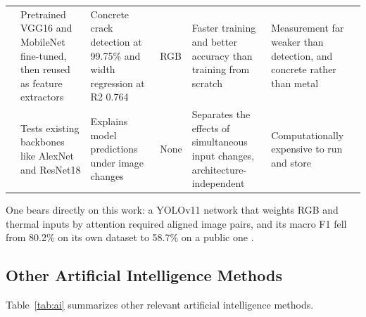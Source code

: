{\begin{xltabular}{\textwidth}{p{0.95cm}>{\RaggedRight\arraybackslash}p{2.6cm}>{\RaggedRight\arraybackslash}p{2.6cm}>{\RaggedRight\arraybackslash}p{2.1cm}>{\RaggedRight\arraybackslash}X>{\RaggedRight\arraybackslash}X}
\citep{Su2024} & Pretrained VGG16 and MobileNet fine-tuned, then reused as feature extractors & Concrete crack detection at 99.75\% and width regression at R2 0.764 & RGB & Faster training and better accuracy than training from scratch & Measurement far weaker than detection, and concrete rather than metal \\
\citep{Kharyuk2026} & Tests existing backbones like AlexNet and ResNet18 & Explains model predictions under image changes & None & Separates the effects of simultaneous input changes, architecture-independent & Computationally expensive to run and store \\
\end{xltabular}
}

One bears directly on this work: a YOLOv11 network that weights RGB and thermal
inputs by attention required aligned image pairs, and its macro F1 fell from
80.2\% on its own dataset to 58.7\% on a public one \citep{Zhang2026b}.

\subsection{Other Artificial Intelligence Methods}

Table~\ref{tab:ai} summarizes other relevant artificial intelligence methods.

